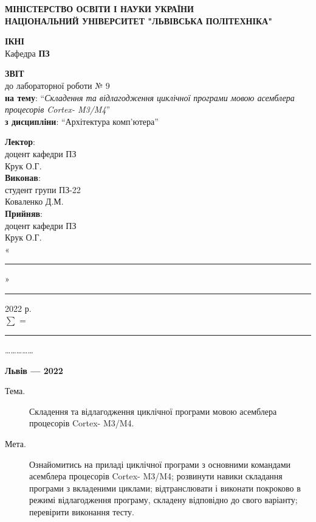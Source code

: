 \documentclass{article}
\newcommand\subject{Архітектура комп'ютера}
\newcommand\lecturer{доцент кафедри ПЗ\\Крук О.Г.}
\newcommand\teacher{доцент кафедри ПЗ\\Крук О.Г.}
\newcommand\mygroup{ПЗ-22}
\newcommand\lab{9}
\newcommand\theme{Складення та відлагодження циклічної програми мовою асемблера процесорів Cortex- M3/M4}
\newcommand\purpose{Ознайомитись на приладі циклічної програми з основними командами асемблера процесорів Cortex- M3/M4; розвинути навики складання програми з вкладеними циклами; відтранслювати і виконати покроково в режимі відлагодження програму, складену відповідно до свого варіанту; перевірити виконання тесту}
\begin{document}
	\begin{normalsize}
		\begin{titlepage}
			\thispagestyle{empty}
			\begin{center}
				\textbf{МІНІСТЕРСТВО ОСВІТИ І НАУКИ УКРАЇНИ\\
					НАЦІОНАЛЬНИЙ УНІВЕРСИТЕТ "ЛЬВІВСЬКА ПОЛІТЕХНІКА"}
			\end{center}
			\begin{flushright}
				\textbf{ІКНІ}\\
				Кафедра \textbf{ПЗ}
			\end{flushright}
			\vspace{200pt}
			\begin{center}
				\textbf{ЗВІТ}\\
				\vspace{10pt}
				до лабораторної роботи № \lab\\
				\textbf{на тему}: “\textit{\theme}”\\
				\textbf{з дисципліни}: “\subject”
			\end{center}
			\vspace{112pt}
			\begin{flushright}
				
				\textbf{Лектор}:\\
				\lecturer\\
				\vspace{28pt}
				\textbf{Виконав}:\\
				
				студент групи \mygroup\\
				Коваленко Д.М.\\
				\vspace{28pt}
				\textbf{Прийняв}:\\
				
				\teacher\\
				
				\vspace{28pt}
				«\rule{1cm}{0.15mm}» \rule{1.5cm}{0.15mm} 2022 р.\\
				$\sum$ = \rule{1cm}{0.15mm}……………\\
				
			\end{flushright}
			\vspace{\fill}
			\begin{center}
				\textbf{Львів — 2022}
			\end{center}
		\end{titlepage}
		
		\begin{description}
			\item[Тема.] \theme.
			\item[Мета.] \purpose.
		\end{description}
		

\end{normalsize}
\end{document}
